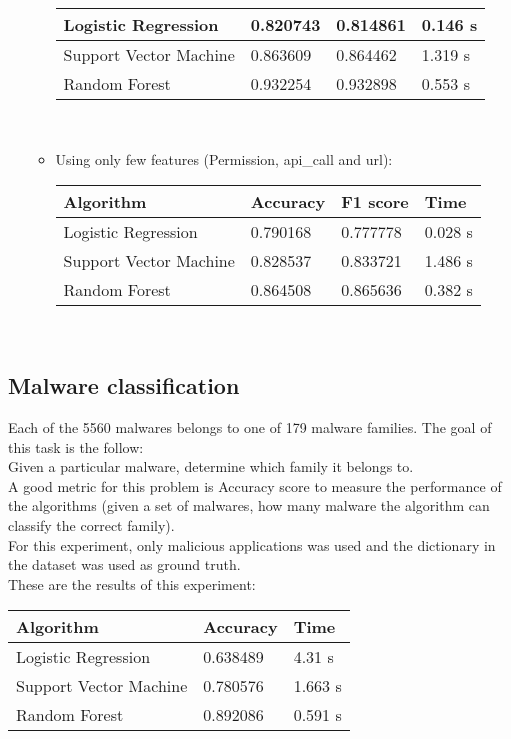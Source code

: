 \documentclass[11pt]{article}
\begin{document}
\begin{itemize}
\begin{itemize}
\begin{tabular}{|p{4.5cm}|p{2cm}|p{2cm}|p{2cm}|}
			\hline
			Logistic Regression & 0.820743 & 0.814861 & 0.146 s \\
			\hline
			Support Vector Machine & 0.863609 & 0.864462 & 1.319 s \\
			\hline
			Random Forest & 0.932254 & 0.932898 & 0.553 s \\
			\hline
		\end{tabular}
		\renewcommand\arraystretch{1} \\
		\item Using only few features (Permission, api\_call and url): \\
		\newline
		\renewcommand\arraystretch{1.5}
		\begin{tabular}{|p{4.5cm}|p{2cm}|p{2cm}|p{2cm}|}
			\hline
			\textbf{Algorithm} & \textbf{Accuracy} & \textbf{F1 score} & \textbf{Time}\\
			\hline
			Logistic Regression & 0.790168 & 0.777778 & 0.028 s \\
			\hline
			Support Vector Machine & 0.828537 & 0.833721 & 1.486 s \\
			\hline
			Random Forest & 0.864508 & 0.865636 & 0.382 s \\
			\hline
		\end{tabular}
		\renewcommand\arraystretch{1} \\
	\end{itemize}
\end{itemize}

\pagebreak
\subsection{Malware classification}
Each of the 5560 malwares belongs to
one of 179 malware families. The goal of this task is the follow: \\ 
Given a particular malware, determine which family it belongs to. \\
A good metric for this problem is Accuracy score to measure the performance of the algorithms (given a set of malwares, how many malware the algorithm can classify the correct family). \\
For this experiment, only malicious applications was used and the dictionary in the dataset was used as ground truth. \\
These are the results of this experiment: \\
\newline
\renewcommand\arraystretch{1.5}
\begin{tabular}{|p{5.5cm}|p{2.5cm}|p{2.5cm}|}
	\hline
	\textbf{Algorithm} & \textbf{Accuracy} & \textbf{Time} \\
	\hline
	Logistic Regression & 0.638489 & 4.31 s \\
	\hline
	Support Vector Machine & 0.780576 & 1.663 s \\
	\hline
	Random Forest & 0.892086 & 0.591 s \\
	\hline
\end{tabular}
\renewcommand\arraystretch{1} \\
\end{document}
